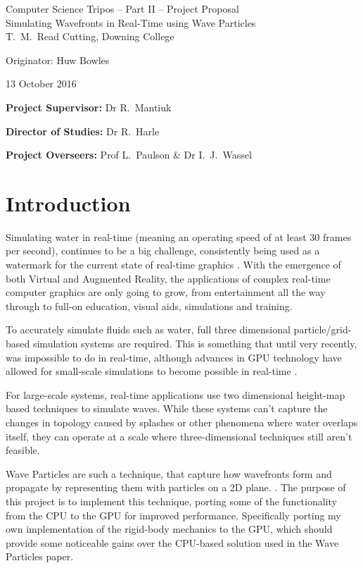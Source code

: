 \begin{center} \Large Computer Science Tripos -- Part II -- Project
Proposal\\[4mm] \LARGE Simulating Wavefronts in Real-Time using Wave
Particles\\[4mm]

\large T.~M.~Read Cutting, Downing College

Originator: Huw Bowles

13 October 2016 \end{center}

\vspace{5mm}

\textbf{Project Supervisor:} Dr R.~Mantiuk

\textbf{Director of Studies:} Dr R.~Harle

\textbf{Project Overseers:} Prof L.~Paulson  \& Dr I.~J.~Wassel


\section*{Introduction}

Simulating water in real-time (meaning an operating speed of at least 30 frames
per second), continues to be a big challenge, consistently being used as a
watermark for the current state of real-time graphics \cite{gamingmobydick}.
With the emergence of both Virtual and Augmented Reality, the applications of
complex real-time computer graphics are only going to grow, from entertainment
all the way through to full-on education, visual aids, simulations and training.

To accurately simulate fluids such as water, full three dimensional
particle/grid-based simulation systems are required. This is something that
until very recently, was impossible to do in real-time, although advances in GPU
technology have allowed for small-scale simulations to become possible in
real-time \cite{Macklin2013}.

For large-scale systems, real-time applications use two dimensional height-map
based techniques to simulate waves. While these systems can't capture the
changes in topology caused by splashes or other phenomena where water overlaps
itself, they can operate at a scale where three-dimensional techniques still
aren't feasible.

Wave Particles are such a technique, that capture how wavefronts form and
propagate by representing them with particles on a 2D plane. \cite{Yuksel2007}.
The purpose of this project is to implement this technique, porting some of the
functionality from the CPU to the GPU for improved performance. Specifically
porting my own implementation of the rigid-body mechanics to the GPU, which
should provide some noticeable gains over the CPU-based solution used in the
Wave Particles paper.

